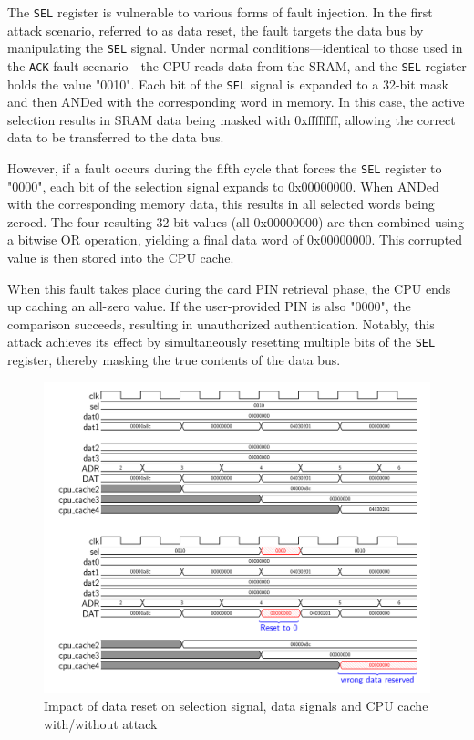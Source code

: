 The \texttt{SEL} register is vulnerable to various forms of fault injection. In the first attack scenario, referred to as data reset, the fault targets the data bus by manipulating the \texttt{SEL} signal. Under normal conditions—identical to those used in the \texttt{ACK} fault scenario—the CPU reads data from the SRAM, and the \texttt{SEL} register holds the value "0010". Each bit of the \texttt{SEL} signal is expanded to a 32-bit mask and then ANDed with the corresponding word in memory. In this case, the active selection results in SRAM data being masked with 0xffffffff, allowing the correct data to be transferred to the data bus.

However, if a fault occurs during the fifth cycle that forces the \texttt{SEL} register to "0000", each bit of the selection signal expands to 0x00000000. When ANDed with the corresponding memory data, this results in all selected words being zeroed. The four resulting 32-bit values (all 0x00000000) are then combined using a bitwise OR operation, yielding a final data word of 0x00000000. This corrupted value is then stored into the CPU cache.

When this fault takes place during the card PIN retrieval phase, the CPU ends up caching an all-zero value. If the user-provided PIN is also "0000", the comparison succeeds, resulting in unauthorized authentication. Notably, this attack achieves its effect by simultaneously resetting multiple bits of the \texttt{SEL} register, thereby masking the true contents of the data bus.

\begin{figure}[t!]
  \centering
  \includegraphics[width=\linewidth]{Chapitre4/figures/fault3.png}
  \caption{Impact of data reset on selection signal, data signals and CPU cache with/without attack}
  \label{fault3}
\end{figure}

